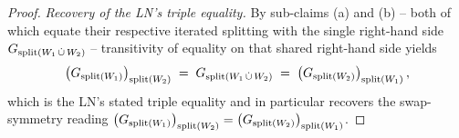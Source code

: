 \documentclass[main]{subfiles}
\begin{document}
\begin{proof}
\medskip\noindent\emph{Recovery of the LN's triple equality.}
By sub-claims (a) and (b) -- both of which equate their respective iterated splitting with the single right-hand side $G_{\mathrm{split}(W_1 \,\dot{\cup}\, W_2)}$ -- transitivity of equality on that shared right-hand side yields
\[
    \left ( G_{\mathrm{split}(W_1)} \right )_{\mathrm{split}(W_2)} \;=\; G_{\mathrm{split}(W_1 \,\dot{\cup}\, W_2)} \;=\; \left ( G_{\mathrm{split}(W_2)} \right )_{\mathrm{split}(W_1)},
\]
which is the LN's stated triple equality and in particular recovers the swap-symmetry reading $\left ( G_{\mathrm{split}(W_1)} \right )_{\mathrm{split}(W_2)} = \left ( G_{\mathrm{split}(W_2)} \right )_{\mathrm{split}(W_1)}$.
\end{proof}
\end{document}
